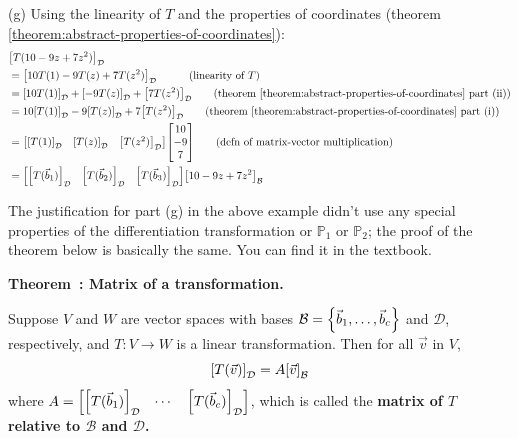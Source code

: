 \documentclass[11pt, letterpaper]{report}
\newenvironment{notes}{}{}
\newenvironment{book}{}{}
\let\originalleft\left
\let\originalright\right
\renewcommand{\left}{\mathopen{}\mathclose\bgroup\originalleft}
\renewcommand{\right}{\aftergroup\egroup\originalright}
\newcounter{example}[section]
\newcounter{theorem}[chapter]
\newenvironment{theorem}[1][]{\refstepcounter{theorem}\begin{bbox}\par
    \noindent\textbf{Theorem~\thetheorem: #1}}{\end{bbox}}
\newlength\oldfboxsep%
\newlength\myminiwidth%
\newenvironment{bbox}{%
  \setlength\oldfboxsep\fboxsep
  \setlength{\fboxsep}{.1in}%
  \setlength\myminiwidth\linewidth%
  \addtolength\myminiwidth{-0.2in}%
  \vspace{0.1in}%
  \begin{lrbox}{\bboxbox}\begin{minipage}{\myminiwidth}%
    }{%
    \end{minipage}\end{lrbox}%
  \noindent\fbox{\usebox{\bboxbox}}\vspace{0.1in}\setlength\fboxsep\oldfboxsep%
}
\newcommand{\Poly}{\mathbb{P}}
\newcommand{\bbbvec}[3]{
  \begin{bmatrix} #1 \\ #2 \\ #3 \end{bmatrix}
}
\begin{document}
\begin{book}
(g) Using the linearity of $T$ and the properties of coordinates (theorem \ref{theorem:abstract-properties-of-coordinates}):
\begin{align*}
&\left[ T(10-9z+7z^2) \right]_{\mathcal{D}}\\
 &= \left[ 10T(1) -9 T(z) +7 T(z^2) \right]_{\mathcal{D}} \quad \quad \quad \text{(linearity of } T\text{)} \\
&= \left[ 10T(1) \right]_{\mathcal{D}} + \left[ -9T(z) \right]_{\mathcal{D}} + \left[ 7T(z^2) \right]_{\mathcal{D}} \quad \quad \text{(theorem \ref{theorem:abstract-properties-of-coordinates} part (ii))} \\
&= 10\left[T(1) \right]_{\mathcal{D}} -9 \left[ T(z) \right]_{\mathcal{D}} + 7\left[ T(z^2) \right]_{\mathcal{D}} \quad \quad \text{(theorem \ref{theorem:abstract-properties-of-coordinates} part (i))} \\
&= \begin{bmatrix}
\left[ T(1) \right]_{\mathcal{D}} & \left[ T(z) \right]_{\mathcal{D}} & \left[ T(z^2) \right]_{\mathcal{D}} 
\end{bmatrix}
\bbbvec{10}{-9}{7} \quad \quad \text{(defn of matrix-vector multiplication)} \\
&= \begin{bmatrix}
\left[ T(\vec{b}_1) \right]_{\mathcal{D}} & \left[ T(\vec{b}_2) \right]_{\mathcal{D}} & \left[ T(\vec{b}_3) \right]_{\mathcal{D}} 
\end{bmatrix}
\left[ 10-9z+7z^2 \right]_{\mathcal{B}}
\end{align*}
\blacksquare
\end{book}

The justification for part (g) in the above example didn't use any special properties of the differentiation transformation or $\Poly_1$ or $\Poly_2$; the proof of the theorem below is basically the same.
\begin{notes}
You can find it in the textbook.
\end{notes}

\begin{theorem}[Matrix of a transformation.] \label{theorem:abstract-matrix-of-transformation}
 

Suppose $V$ and $W$ are vector spaces with bases $\mathcal{B} = \left\{ \vec{b}_1,\ldots,\vec{b}_c \right\}$ and $\mathcal{D}$, respectively, and $T:V \rightarrow W$ is a linear transformation. Then for all $\vec{v}$ in $V$,
\[\left[ T(\vec{v}) \right]_{\mathcal{D}} = A \left[ \vec{v} \right]_{\mathcal{B}}\]
where $A = \begin{bmatrix}
\left[ T(\vec{b}_1) \right]_{\mathcal{D}} & \cdots  & \left[ T(\vec{b}_c) \right]_{\mathcal{D}} 
\end{bmatrix}$, which is called the \textbf{matrix of $T$ relative to $\mathcal{B}$ and $\mathcal{D}$.}
\end{theorem}
\end{document}
